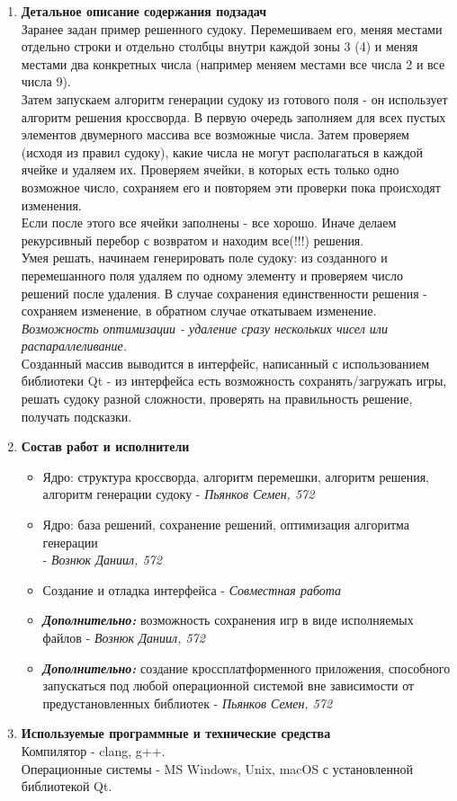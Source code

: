\documentclass[12pt]{article}
\begin{document}
\begin{enumerate}
\item \textbf{Детальное описание содержания подзадач} \\
Заранее задан пример решенного судоку. Перемешиваем его, меняя местами отдельно строки и отдельно столбцы внутри каждой зоны 3 (4) и меняя местами два конкретных числа (например меняем местами все числа 2 и все числа 9).\\
Затем запускаем алгоритм генерации судоку из готового поля - он использует алгоритм решения кроссворда. В первую очередь заполняем для всех пустых элементов двумерного массива все возможные числа. Затем проверяем (исходя из правил судоку), какие числа не могут располагаться в каждой ячейке и удаляем их. Проверяем ячейки, в которых есть только одно возможное число, сохраняем его и повторяем эти проверки пока происходят изменения.\\
Если после этого все ячейки заполнены - все хорошо. Иначе делаем рекурсивный перебор с возвратом и находим все(!!!) решения.\\
Умея решать, начинаем генерировать поле судоку: из созданного и перемешанного поля удаляем по одному элементу и проверяем число решений после удаления. В случае сохранения единственности решения - сохраняем изменение, в обратном случае откатываем изменение. \textit{Возможность оптимизации - удаление сразу нескольких чисел или распараллеливание.}\\
Созданный массив выводится в интерфейс, написанный с использованием библиотеки Qt - из интерфейса есть возможность сохранять/загружать игры, решать судоку разной сложности, проверять на правильность решение, получать подсказки.\\

\item \textbf{Состав работ и исполнители} 
\begin{itemize}
    \item Ядро: структура кроссворда, алгоритм перемешки, алгоритм решения, алгоритм генерации судоку - \textit{Пьянков Семен, 572}
    \item Ядро: база решений, сохранение решений, оптимизация алгоритма генерации\\ - \textit{Вознюк Даниил, 572}
    \item Создание и отладка интерфейса - \textit{Совместная работа}
    \item \textbf{\textit{Дополнительно:}} возможность сохранения игр в виде исполняемых файлов - \textit{Вознюк Даниил, 572}
    \item \textbf{\textit{Дополнительно:}} создание кроссплатформенного приложения, способного запускаться под любой операционной системой вне зависимости от предустановленных библиотек - \textit{Пьянков Семен, 572}
\end{itemize}

\item \textbf{Используемые программные и технические средства} \\
Компилятор - clang, g++.\\
Операционные системы - MS Windows, Unix, macOS с установленной библиотекой Qt.

\end{enumerate}
\end{document}
